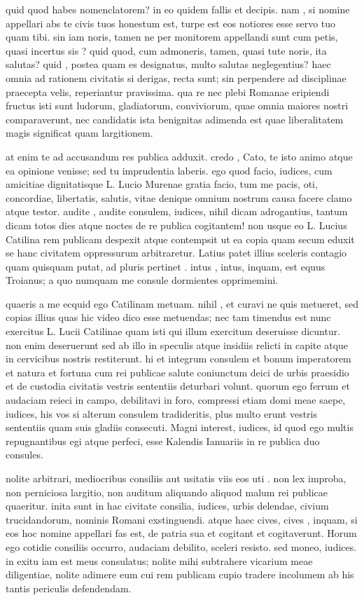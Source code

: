  quid quod habes nomenclatorem? in eo quidem fallis et decipis. nam , si nomine appellari abs te civis tuos honestum est, turpe est eos notiores esse servo tuo quam tibi. sin iam noris, tamen ne per monitorem appellandi sunt cum petis, quasi incertus sis ? quid quod, cum admoneris, tamen, quasi tute noris, ita salutas? quid , postea quam es designatus, multo salutas neglegentius? haec omnia ad rationem civitatis si derigas, recta sunt; sin perpendere ad disciplinae praecepta velis, reperiantur pravissima. qua re nec plebi Romanae eripiendi fructus isti sunt ludorum, gladiatorum, conviviorum, quae omnia maiores nostri comparaverunt, nec candidatis ista benignitas adimenda est quae liberalitatem magis significat quam largitionem.

 at enim te ad accusandum res publica adduxit. credo , Cato, te isto animo atque ea opinione venisse; sed tu imprudentia laberis. ego quod facio, iudices, cum amicitiae dignitatisque L. Lucio Murenae gratia facio, tum me pacis, oti, concordiae, libertatis, salutis, vitae denique omnium nostrum causa facere clamo atque testor. audite , audite consulem, iudices, nihil dicam adrogantius, tantum dicam totos dies atque noctes de re publica cogitantem! non usque eo L. Lucius Catilina rem publicam despexit atque contempsit ut ea copia quam secum eduxit se hanc civitatem oppressurum arbitraretur. Latius patet illius sceleris contagio quam quisquam putat, ad pluris pertinet . intus , intus, inquam, est equus Troianus; a quo numquam me consule dormientes opprimemini.

 quaeris a me ecquid ego Catilinam metuam. nihil , et curavi ne quis metueret, sed copias illius quas hic video dico esse metuendas; nec tam timendus est nunc exercitus L. Lucii Catilinae quam isti qui illum exercitum deseruisse dicuntur. non enim deseruerunt sed ab illo in speculis atque insidiis relicti in capite atque in cervicibus nostris restiterunt. hi et integrum consulem et bonum imperatorem et natura et fortuna cum rei publicae salute coniunctum deici de urbis praesidio et de custodia civitatis vestris sententiis deturbari volunt. quorum ego ferrum et audaciam reieci in campo, debilitavi in foro, compressi etiam domi meae saepe, iudices, his vos si alterum consulem tradideritis, plus multo erunt vestris sententiis quam suis gladiis consecuti. Magni interest, iudices, id quod ego multis repugnantibus egi atque perfeci, esse Kalendis Ianuariis in re publica duo consules.

 nolite arbitrari, mediocribus consiliis aut usitatis viis eos uti . non lex improba, non perniciosa largitio, non auditum aliquando aliquod malum rei publicae quaeritur. inita sunt in hac civitate consilia, iudices, urbis delendae, civium trucidandorum, nominis Romani exstinguendi. atque haec cives, cives , inquam, si eos hoc nomine appellari fas est, de patria sua et cogitant et cogitaverunt. Horum ego cotidie consiliis occurro, audaciam debilito, sceleri resisto. sed moneo, iudices. in exitu iam est meus consulatus; nolite mihi subtrahere vicarium meae diligentiae, nolite adimere eum cui rem publicam cupio tradere incolumem ab his tantis periculis defendendam.

